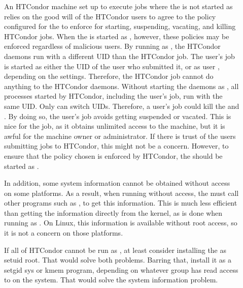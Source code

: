 \begin{description}

\item[] An HTCondor machine set up to execute jobs where the
    is not started as 
   relies on the good will of the HTCondor users to agree to the policy
   configured for the  to enforce for starting, suspending,
   vacating, and killing HTCondor jobs. 
   When the  is started
   as , however, these policies may be enforced regardless of
   malicious users.  By running as , the HTCondor daemons run with a
   different UID than the HTCondor job. 
   The user's job is started as either the UID of the user who submitted
   it, or as user , depending on the 
   settings.
   Therefore, the HTCondor job cannot do anything to the HTCondor daemons.
   Without starting the daemons as , all
   processes started by HTCondor, including the user's job, run with
   the same UID. Only  can switch UIDs.
   Therefore, a user's job could kill the  and
   . By doing so, the user's job avoids
   getting suspended or vacated.
   This is nice for the job, as it obtains unlimited access to the
   machine, but it is awful for the machine owner or administrator.
   If there is trust of the users submitting jobs to HTCondor,
   this might not be a concern.  
   However, to ensure that the policy chosen is
   enforced by HTCondor, the  should be
   started as .

   In addition, some system information cannot be obtained without
    access on some platforms.
   As a result, when running without  access,
   the  must
   call other programs such as ,
   to get this information.
   This is much less efficient than getting the
   information directly from the kernel,
   as is done when running as .
   On Linux, this information is available without root access,
   so it is not a concern on those platforms.

   If all of HTCondor cannot be run as , at least consider
   installing the  as setuid root.  That
   would solve both problems.  Barring that,
   install it as a setgid sys or kmem program,
   depending on
   whatever group has read access to  on the system.
   That would solve the system information problem.


\end{description}
